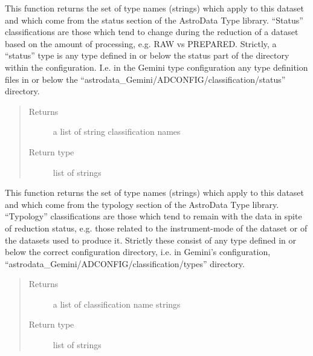 \documentclass[letterpaper,10pt,english]{sphinxmanual}
\begin{document}

\begin{fulllineitems}
\label{chapter_AstroDataClass:astrodata.data.AstroData.get_status}
This function returns the set of type names (strings) which apply to
this dataset and which come from the status section of the AstroData
Type library. ``Status'' classifications are those which tend to change
during the reduction of a dataset based on the amount of processing,
e.g. RAW vs PREPARED.  Strictly, a ``status'' type 
is any type defined in or below the status part of the 
 directory within the 
configuration. I.e. in the Gemini type configuration any type 
definition files in or below the 
``astrodata\_Gemini/ADCONFIG/classification/status'' directory.
\begin{quote}\begin{description}
\item[{Returns}] \leavevmode
a list of string classification names

\item[{Return type}] \leavevmode
list of strings

\end{description}\end{quote}

\end{fulllineitems}



\begin{fulllineitems}
\label{chapter_AstroDataClass:astrodata.data.AstroData.get_typology}
This function returns the set of type names (strings) which apply to
this dataset and which come from the typology section of the AstroData
Type library. ``Typology'' classifications are those which tend to remain
with the data in spite of reduction status, e.g. those related to the
instrument-mode of the dataset or of the datasets used to produce
it. Strictly these consist of any type defined in or below
the correct configuration directory, i.e. in Gemini's configuration,
``astrodata\_Gemini/ADCONFIG/classification/types''  directory.
\begin{quote}\begin{description}
\item[{Returns}] \leavevmode
a list of classification name strings

\item[{Return type}] \leavevmode
list of strings

\end{description}\end{quote}

\end{fulllineitems}
\end{document}
